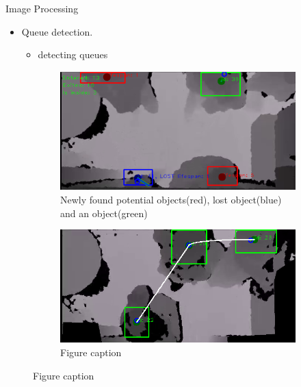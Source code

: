 \documentclass[final,hyperref={pdfpagelabels=false}]{beamer}
\begin{document}
\begin{frame}[t]
\begin{columns}[t]
\begin{column}{.465\textwidth}
\begin{block}{Image Processing}
\begin{itemize}
	\item Queue detection.
	\begin{itemize}
		\item detecting queues
	\end{itemize}
\end{itemize}

\begin{figure}
\begin{subfigure}{.5\textwidth}
\centering
\includegraphics[width=0.9\linewidth]{trackingExample.png}
\caption{\centering Newly found potential objects(red), lost 
		 object(blue) and an object(green)}
\end{subfigure}%
\begin{subfigure}{.5\textwidth}
\centering
\includegraphics[width=0.9\linewidth]{visibleQueue.png}
\caption{\centering Figure caption}
\end{subfigure}
\end{figure}

\end{block}







\end{column}
\end{columns}
\end{frame}
\end{document}
